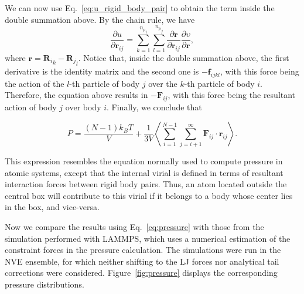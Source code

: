 \documentclass[aip,jcp,reprint,amsmath,amssymb]{revtex4-1}
\newcommand{\vt}[1]{\boldsymbol{\mathbf{#1}}}           %
\newcommand{\diff}[2]{\dfrac{\partial #1}{\partial #2}} %
\begin{document}
We can now use Eq.~\ref{eq:u_rigid_body_pair} to obtain the term inside the double summation above. By the chain rule, we have
\[
\diff{u}{{\vt r}_{ij}} = \sum_{k=1}^{{n_p}_i} \sum_{l=1}^{{n_p}_j} \diff{\vt r}{\vt r_{ij}} \diff{\upsilon}{\vt r},
\]
where $\vt r = {{\vt R}_i}_k - {{\vt R}_j}_l$. Notice that, inside the double summation above, the first derivative is the identity matrix and the second one is $-{\vt f}_{ijkl}$, with this force being the action of the $l$-th particle of body $j$ over the $k$-th particle of body $i$. Therefore, the equation above results in $-\vt F_{ij}$, with this force being the resultant action of body $j$ over body $i$. Finally, we conclude that

\begin{equation}
\label{eq:pressure}
P = \frac{(N-1) k_B T}{V} + \frac{1}{3V} \left\langle \sum_{i=1}^{N-1} \sum_{j=i+1}^{\infty}{\vt F}_{ij} \cdot {\vt r}_{ij}  \right\rangle.
\end{equation}

This expression resembles the equation normally used to compute pressure in atomic systems, except that the internal virial is defined in terms of resultant interaction forces between rigid body pairs. Thus, an atom located outside the central box will contribute to this virial if it belongs to a body whose center lies in the box, and vice-versa.

Now we compare the results using Eq.~\ref{eq:pressure} with those from the simulation performed with LAMMPS, which uses a numerical estimation of the constraint forces in the pressure calculation. The simulations were run in the NVE ensemble, for which neither shifting to the LJ forces nor analytical tail corrections were considered. Figure~\ref{fig:pressure} displays the corresponding pressure distributions.

\end{document}
